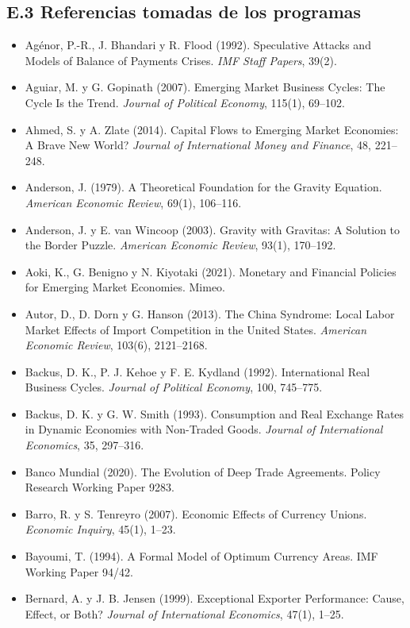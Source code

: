 \documentclass[11pt,a4paper]{article}
\begin{document}
\subsection*{E.3 Referencias tomadas de los programas}
{\small
\begin{itemize}[leftmargin=1.4em,itemsep=1pt,label={}]
\item Agénor, P.-R., J. Bhandari y R. Flood (1992). Speculative Attacks and Models of Balance of Payments Crises. \emph{IMF Staff Papers}, 39(2).
\item Aguiar, M. y G. Gopinath (2007). Emerging Market Business Cycles: The Cycle Is the Trend. \emph{Journal of Political Economy}, 115(1), 69--102.
\item Ahmed, S. y A. Zlate (2014). Capital Flows to Emerging Market Economies: A Brave New World? \emph{Journal of International Money and Finance}, 48, 221--248.
\item Anderson, J. (1979). A Theoretical Foundation for the Gravity Equation. \emph{American Economic Review}, 69(1), 106--116.
\item Anderson, J. y E. van Wincoop (2003). Gravity with Gravitas: A Solution to the Border Puzzle. \emph{American Economic Review}, 93(1), 170--192.
\item Aoki, K., G. Benigno y N. Kiyotaki (2021). Monetary and Financial Policies for Emerging Market Economies. Mimeo.
\item Autor, D., D. Dorn y G. Hanson (2013). The China Syndrome: Local Labor Market Effects of Import Competition in the United States. \emph{American Economic Review}, 103(6), 2121--2168.
\item Backus, D. K., P. J. Kehoe y F. E. Kydland (1992). International Real Business Cycles. \emph{Journal of Political Economy}, 100, 745--775.
\item Backus, D. K. y G. W. Smith (1993). Consumption and Real Exchange Rates in Dynamic Economies with Non-Traded Goods. \emph{Journal of International Economics}, 35, 297--316.
\item Banco Mundial (2020). The Evolution of Deep Trade Agreements. Policy Research Working Paper 9283.
\item Barro, R. y S. Tenreyro (2007). Economic Effects of Currency Unions. \emph{Economic Inquiry}, 45(1), 1--23.
\item Bayoumi, T. (1994). A Formal Model of Optimum Currency Areas. IMF Working Paper 94/42.
\item Bernard, A. y J. B. Jensen (1999). Exceptional Exporter Performance: Cause, Effect, or Both? \emph{Journal of International Economics}, 47(1), 1--25.

\end{itemize}}
\end{document}
